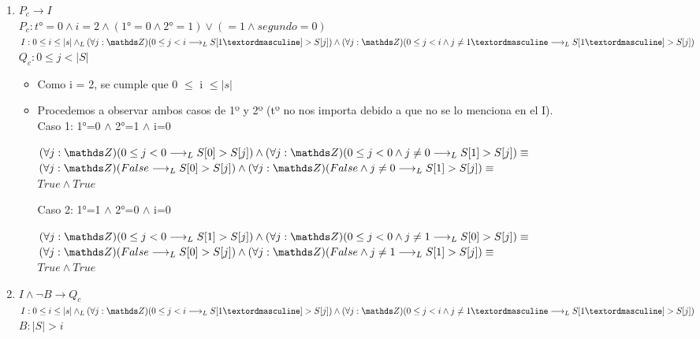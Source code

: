 \documentclass[10pt,a4paper]{article}
\begin{document}
\begin{enumerate}
    \item $P_c \longrightarrow I$ \\
    $P_c : t°=0 \land i=2 \land (1°=0 \land 2° = 1) \lor ( = 1 \land segundo=0)$ \\
    $I : 0 \leq i \leq |s| \land_{L} (\forall j:\ent)(0 \leq j < i \longrightarrow_{L} S[1º]>S[j]) \land (\forall j:\ent)(0 \leq j < i \land j \neq 1º \longrightarrow_{L} S[1º]>S[j])$
    $Q_c : 0\leq j <|S| $
    \begin{itemize}
        \item Como i = 2, se cumple que 0 $\leq$ i $\leq |s|$
            \item Procedemos a observar ambos casos de 1º y 2º (tº no nos importa debido a que no se lo menciona en el I). 
                 \\ Caso 1: 1°=0 $\land$ 2°=1 $\land$ i=0
                    \begin{center}
                        $(\forall j:\ent)(0 \leq j < 0 \longrightarrow_{L} S[0]>S[j]) \land (\forall j:\ent)(0 \leq j < 0 \land j \neq 0 \longrightarrow_{L} S[1]>S[j]) \equiv$
                    \\  $(\forall j:\ent)(False \longrightarrow_{L} S[0]>S[j]) \land (\forall j:\ent)(False \land j \neq 0 \longrightarrow_{L} S[1]>S[j]) \equiv$
                    \\ $True \land True$ \; 
                    \end{center}
                  Caso 2: 1°=1 $\land$ 2°=0 $\land$ i=0
                    \begin{center}
                        $(\forall j:\ent)(0 \leq j < 0 \longrightarrow_{L} S[1]>S[j]) \land (\forall j:\ent)(0 \leq j < 0 \land j \neq 1 \longrightarrow_{L} S[0]>S[j]) \equiv $
                    \\  $(\forall j:\ent)(False \longrightarrow_{L} S[0]>S[j]) \land (\forall j:\ent)(False \land j \neq 1 \longrightarrow_{L} S[1]>S[j]) \equiv $
                    \\  $True \land True \;$
                    \end{center}
    \end{itemize}
    \item $I \land \neg B \longrightarrow Q_c$
    $I : 0 \leq i \leq |s| \land_{L} (\forall j:\ent)(0 \leq j < i \longrightarrow_{L} S[1º]>S[j]) \land (\forall j:\ent)(0 \leq j < i \land j \neq 1º \longrightarrow_{L} S[1º]>S[j])$
    $B : |S| > i$
    
    

\end{enumerate}
\end{document}
